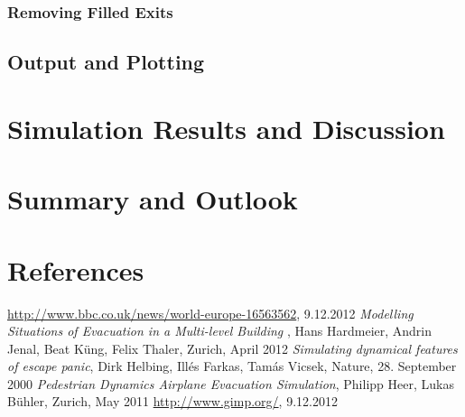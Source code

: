 \documentclass[11pt]{article}
\begin{document}
\subsubsection{Removing Filled Exits}
\label{sub:exitremove}

\subsection{Output and Plotting}
\label{sub:output}

\section{Simulation Results and Discussion}

\section{Summary and Outlook}

\section{References}



\begingroup 
\renewcommand{\section}[2]{}%
\begin{thebibliography}{9}

		\url{http://www.bbc.co.uk/news/world-europe-16563562}, 9.12.2012
	\emph{Modelling Situations of Evacuation
in a Multi-level Building} , 
Hans Hardmeier, Andrin Jenal, Beat Küng, Felix Thaler, Zurich, April 2012
		\emph{Simulating dynamical features of escape panic},
		Dirk Helbing, Ill\'es Farkas, Tam\'as Vicsek, Nature, 28. September 2000
		\emph{Pedestrian Dynamics Airplane Evacuation Simulation},
		Philipp Heer, Lukas Bühler, Zurich, May 2011
		\url{http://www.gimp.org/}, 9.12.2012
\end{thebibliography}
\endgroup
\end{document}
